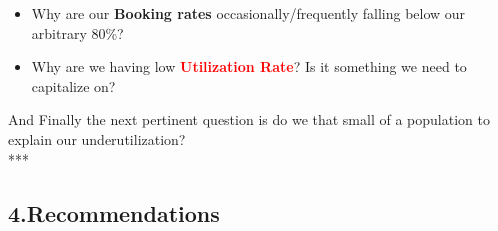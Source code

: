 \documentclass[]{article}
\providecommand{\tightlist}{%
  \setlength{\itemsep}{0pt}\setlength{\parskip}{0pt}}
\begin{document}
\begin{itemize}
\tightlist
\item
  Why are our \textbf{Booking rates} occasionally/frequently falling
  below our arbitrary 80\%?
\item
  Why are we having low \textcolor{red}{\textbf{Utilization Rate}}? Is
  it something we need to capitalize on?
\end{itemize}

And Finally the next pertinent question is do we that small of a
population to explain our underutilization?\\
***

\hypertarget{recommendations}{%
\subsection{4.Recommendations}\label{recommendations}}
\end{document}
